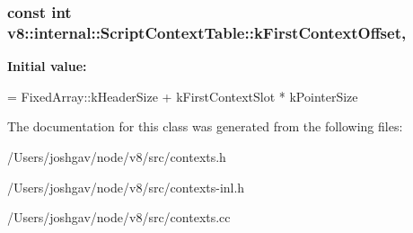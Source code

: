 \subsubsection[{\texorpdfstring{k\+First\+Context\+Offset}{kFirstContextOffset}}]{\setlength{\rightskip}{0pt plus 5cm}const int v8\+::internal\+::\+Script\+Context\+Table\+::k\+First\+Context\+Offset\hspace{0.3cm}{\ttfamily [static]}, {\ttfamily [private]}}\hypertarget{classv8_1_1internal_1_1_script_context_table_a572cc2414289e3924e8c7abf0f6acb5b}{}\label{classv8_1_1internal_1_1_script_context_table_a572cc2414289e3924e8c7abf0f6acb5b}
{\bfseries Initial value\+:}
\begin{DoxyCode}
=
      FixedArray::kHeaderSize + kFirstContextSlot * kPointerSize
\end{DoxyCode}


The documentation for this class was generated from the following files\+:\begin{DoxyCompactItemize}
\item 
/\+Users/joshgav/node/v8/src/contexts.\+h\item 
/\+Users/joshgav/node/v8/src/contexts-\/inl.\+h\item 
/\+Users/joshgav/node/v8/src/contexts.\+cc\end{DoxyCompactItemize}
